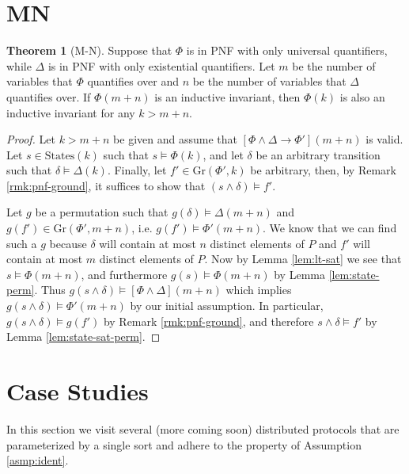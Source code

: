 \documentclass[12pt]{article}
\theoremstyle{definition}
\newtheorem{theorem}{Theorem}
\theoremstyle{remark}
\newcommand{\states}{\text{States}}
\newcommand{\gr}{\text{Gr}}
\begin{document}
\section{MN}
\begin{theorem}[M-N]
  Suppose that $\Phi$ is in PNF with only universal quantifiers, while $\Delta$ is in PNF with only existential quantifiers.  Let $m$ be the number of variables that $\Phi$ quantifies over and $n$ be the number of variables that $\Delta$ quantifies over.  If $\Phi(m+n)$ is an inductive invariant, then $\Phi(k)$ is also an inductive invariant for any $k>m+n$.
\end{theorem}
\begin{proof}
  Let $k>m+n$ be given and assume that $[\Phi\land\Delta \rightarrow \Phi'](m+n)$ is valid.  Let $s \in \states(k)$ such that $s \models \Phi(k)$, and let $\delta$ be an arbitrary transition such that $\delta \models \Delta(k)$.  Finally, let $f' \in \gr(\Phi',k)$ be arbitrary, then, by Remark \ref{rmk:pnf-ground}, it suffices to show that $(s \land \delta) \models f'$.

  Let $g$ be a permutation such that $g(\delta) \models \Delta(m+n)$ and $g(f') \in \gr(\Phi',m+n)$, i.e. $g(f') \models \Phi'(m+n)$.  We know that we can find such a $g$ because $\delta$ will contain at most $n$ distinct elements of $P$ and $f'$ will contain at most $m$ distinct elements of $P$.  Now by Lemma \ref{lem:lt-sat} we see that $s \models \Phi(m+n)$, and furthermore $g(s) \models \Phi(m+n)$ by Lemma \ref{lem:state-perm}.  Thus $g(s \land \delta) \models [\Phi\land\Delta](m+n)$ which implies $g(s \land \delta) \models \Phi'(m+n)$ by our initial assumption.  In particular, $g(s \land \delta) \models g(f')$ by Remark \ref{rmk:pnf-ground}, and therefore $s \land \delta \models f'$ by Lemma \ref{lem:state-sat-perm}.
\end{proof}



\section{Case Studies}
In this section we visit several (more coming soon) distributed protocols that are parameterized by a single sort and adhere to the property of Assumption \ref{asmp:ident}.
\end{document}
